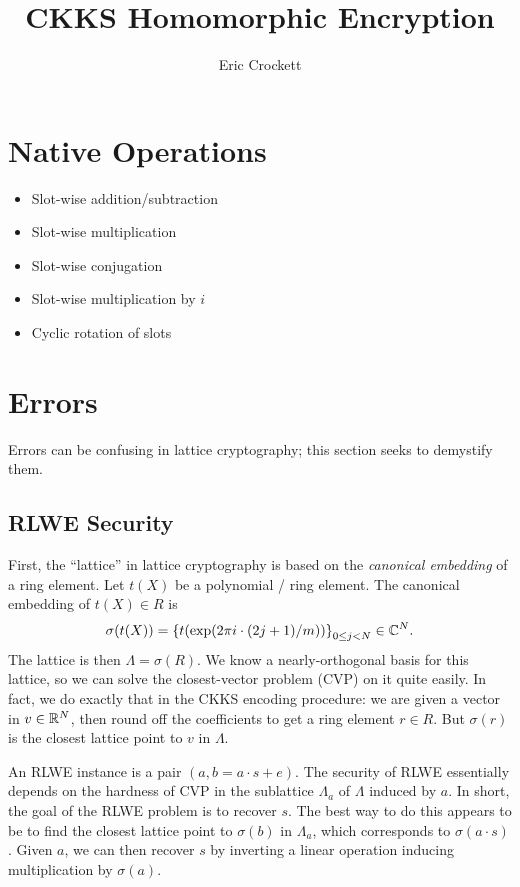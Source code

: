 \documentclass[../fheimpl.tex]{subfiles}
\title{CKKS Homomorphic Encryption}
\author{Eric Crockett}
\begin{document}
\ifcompileasbook
\else
\maketitle
\listoffixmes
\fi

\section{Native Operations}
    \begin{itemize}
        \item Slot-wise addition/subtraction
        \item Slot-wise multiplication
        \item Slot-wise conjugation
        \item Slot-wise multiplication by $i$
        \item Cyclic rotation of slots		
    \end{itemize}

\section{Errors}
Errors can be confusing in lattice cryptography; this section seeks to demystify them. 

\subsection{RLWE Security}
First, the ``lattice'' in lattice cryptography is based on the \emph{canonical embedding} of a ring element. Let $t(X)$ be a polynomial / ring element. The canonical embedding of $t(X)\in R$ is
\[\sigma(t(X)) = \set*{t\parens*{\exp\parens*{2\pi i\cdot (2j+1)/m}}}_{0\le j<N}\in \C^N.\]
The lattice is then $\Lambda=\sigma(R)$. We know a nearly-orthogonal basis for this lattice, so we can solve the closest-vector problem (CVP) on it quite easily. In fact, we do exactly that in the CKKS encoding procedure: we are given a vector in $v\in \mathbb{R}^N$, then round off the coefficients to get a ring element $r\in R$. But $\sigma(r)$ is the closest lattice point to $v$ in $\Lambda$.

An RLWE instance is a pair $(a, b=a\cdot s+e)$. The security of RLWE essentially depends on the hardness of CVP in the sublattice $\Lambda_a$ of $\Lambda$ induced by $a$. In short, the goal of the RLWE problem is to recover $s$. The best way to do this appears to be to find the closest lattice point to $\sigma(b)$ in $\Lambda_a$, which corresponds to $\sigma(a\cdot s)$. Given $a$, we can then recover $s$ by inverting a linear operation inducing multiplication by $\sigma(a)$.
\end{document}
